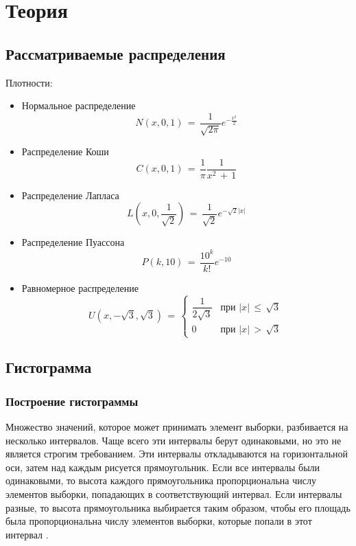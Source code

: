 \newpage
\section{Теория}
\subsection{ Рассматриваемые распределения}
\begin{flushleft}
	Плотности:
	\begin{itemize}
		\item Нормальное распределение
		\begin{equation}
			\label{3} N(x, 0, 1)\,=\,\frac{1}{\sqrt{2\pi}}e^{-\frac{x^2}{2}}
		\end{equation}
		\item Распределение Коши
		\begin{equation}
			\label{4} C(x, 0, 1)\,=\,\frac{1}{\pi}\frac{1}{x^2\,+\,1}
		\end{equation}
		\item Распределение Лапласа
		\begin{equation}
			\label{5} L(x, 0, \frac{1}{\sqrt{2}})\,=\,\frac{1}{\sqrt{2}}e^{-\sqrt{2}\left|x\right|}
		\end{equation}
		\item Распределение Пуассона
		\begin{equation}
			\label{6} P(k, 10)\,=\,\frac{10^k}{k!}e^{-10}
		\end{equation}
		\item Равномерное распределение
		\begin{equation}
			\label{7} U(x, -\sqrt{3}, \sqrt{3})\,=\,
			\begin{cases}
				\dfrac{1}{2\sqrt{3}} &\text{при $\left|x\right|\,\leq\,\sqrt{3}$}\\
				0 &\text{при $\left|x\right|\,>\,\sqrt{3}$}
			\end{cases}
		\end{equation}
	\end{itemize}
\end{flushleft}

\subsection{Гистограмма}
\subsubsection{Построение гистограммы}
\begin{flushleft}
Множество значений, которое может принимать элемент выборки, разбивается на несколько интервалов. Чаще всего эти интервалы берут одинаковыми, но это не является строгим требованием. Эти интервалы откладываются на горизонтальной оси, затем над каждым рисуется прямоугольник. Если все интервалы были одинаковыми, то высота каждого прямоугольника пропорциональна числу элементов выборки, попадающих в соответствующий интервал. Если интервалы разные, то высота прямоугольника выбирается таким образом, чтобы его площадь была пропорциональна числу элементов выборки, которые попали в этот интервал \cite{1}.
\end{flushleft}


